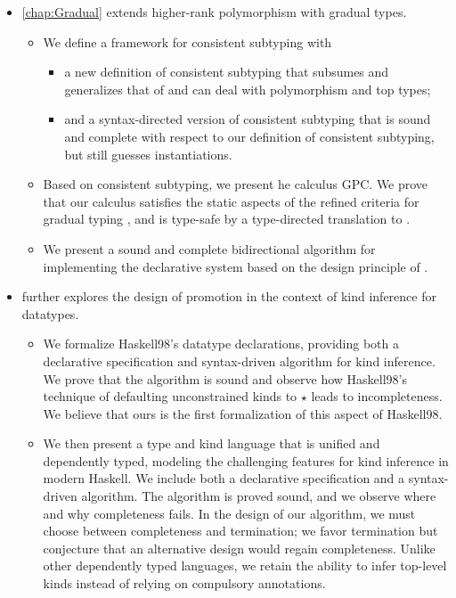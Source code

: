 \begin{description}
\begin{itemize}
  \item \cref{chap:Gradual} extends higher-rank
    polymorphism with gradual types.
    \begin{itemize}
    \item We define a framework for consistent subtyping with
      \begin{itemize}
      \item a new definition of
        consistent subtyping that subsumes and generalizes that of
        \cite{siek:consistent:subtyping} and can deal with polymorphism and top
        types;
      \item and a syntax-directed version of consistent subtyping that is sound
        and complete with respect to our definition of consistent subtyping, but
        still guesses instantiations.
      \end{itemize}
    \item Based on consistent subtyping, we present he calculus GPC. We prove that
      our calculus satisfies the static aspects of the refined criteria for
      gradual typing \citep{siek:criteria}, and is type-safe by a type-directed
      translation to \pbc \citep{amal:blame}.
    \item We present a sound and complete
      bidirectional algorithm for implementing the declarative system based on
      the design principle of \cite{garcia:principal}.
    \end{itemize}
  \item {} further explores the design of promotion in the context of kind
    inference for datatypes.
    \begin{itemize}
    \item We formalize Haskell98’s datatype declarations, providing both a
      declarative specification and syntax-driven algorithm for kind inference. We
      prove that the algorithm is sound and observe how Haskell98’s technique of
      defaulting unconstrained kinds to $\star$ leads to incompleteness. We
      believe that ours is the first formalization of this aspect of Haskell98.
    \item We then present a type and kind language that is unified and dependently
      typed, modeling the challenging features for kind inference in modern
      Haskell. We include both a declarative specification and a syntax-driven
      algorithm. The algorithm is proved sound, and we observe where and why
      completeness fails. In the design of our algorithm, we must choose between
      completeness and termination; we favor termination but conjecture that an
      alternative design would regain completeness. Unlike other dependently typed
      languages, we retain the ability to infer top-level kinds instead of relying
      on compulsory annotations.
    \end{itemize}
  \end{itemize}
\end{description}

